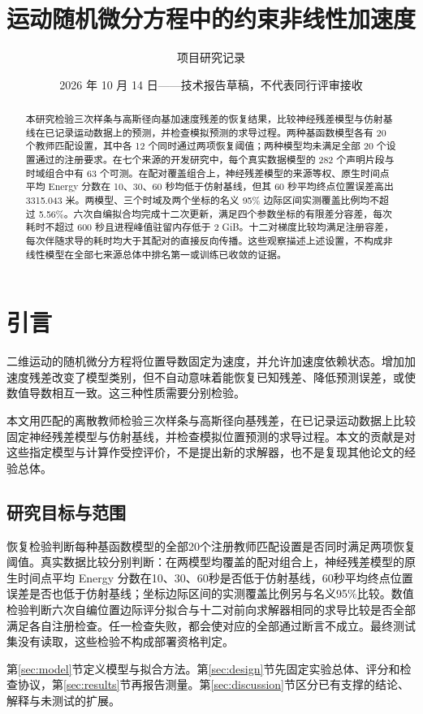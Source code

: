 \documentclass[UTF8,11pt]{ctexart}
\title{运动随机微分方程中的约束非线性加速度}
\author{项目研究记录}
\date{2026 年 10 月 14 日——技术报告草稿，不代表同行评审接收}
\begin{document}
\maketitle
\begin{abstract}
本研究检验三次样条与高斯径向基加速度残差的恢复结果，比较神经残差模型与仿射基线在已记录运动数据上的预测，并检查模拟预测的求导过程。两种基函数模型各有 20 个教师匹配设置，其中各 12 个同时通过两项恢复阈值；两种模型均未满足全部 20 个设置通过的注册要求。在七个来源的开发研究中，每个真实数据模型的 282 个声明片段与时域组合中有 63 个可测。在配对覆盖组合上，神经残差模型的来源等权、原生时间点平均 Energy 分数在 10、30、60 秒均低于仿射基线，但其 60 秒平均终点位置误差高出 3315.043 米。两模型、三个时域及两个坐标的名义 95\% 边际区间实测覆盖比例均不超过 5.56\%。六次自编拟合均完成十二次更新，满足四个参数坐标的有限差分容差，每次耗时不超过 600 秒且进程峰值驻留内存低于 2 GiB。十二对梯度比较均满足注册容差，每次伴随求导的耗时均大于其配对的直接反向传播。这些观察描述上述设置，不构成非线性模型在全部七来源总体中排名第一或训练已收敛的证据。
\end{abstract}

\section{引言}\label{sec:introduction}
二维运动的随机微分方程将位置导数固定为速度，并允许加速度依赖状态。增加加速度残差改变了模型类别，但不自动意味着能恢复已知残差、降低预测误差，或使数值导数相互一致。这三种性质需要分别检验。

本文用匹配的离散教师检验三次样条与高斯径向基残差，在已记录运动数据上比较固定神经残差模型与仿射基线，并检查模拟位置预测的求导过程。本文的贡献是对这些指定模型与计算作受控评价，不是提出新的求解器，也不是复现其他论文的经验总体。

\subsection{研究目标与范围}\label{sec:questions}
恢复检验判断每种基函数模型的全部20个注册教师匹配设置是否同时满足两项恢复阈值。真实数据比较分别判断：在两模型均覆盖的配对组合上，神经残差模型的原生时间点平均 Energy 分数在10、30、60秒是否低于仿射基线，60秒平均终点位置误差是否也低于仿射基线；坐标边际区间的实测覆盖比例另与名义95\%比较。数值检验判断六次自编位置边际评分拟合与十二对前向求解器相同的求导比较是否全部满足各自注册检查。任一检查失败，都会使对应的全部通过断言不成立。最终测试集没有读取，这些检验不构成部署资格判定。

第\ref{sec:model}节定义模型与拟合方法。第\ref{sec:design}节先固定实验总体、评分和检查协议，第\ref{sec:results}节再报告测量。第\ref{sec:discussion}节区分已有支撑的结论、解释与未测试的扩展。
\end{document}
